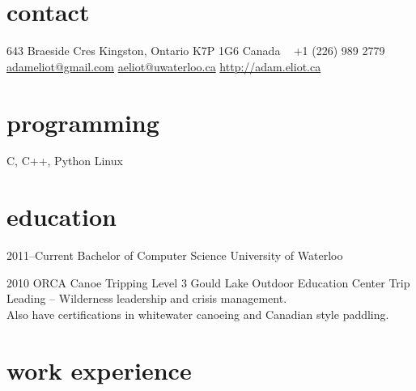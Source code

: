 \documentclass[]{eliot-cv} %
\begin{document}


\begin{aside} %
\section{contact}
643 Braeside Cres
Kingston, Ontario 
K7P 1G6
Canada
~
+1 (226) 989 2779
~
\href{mailto:adameliot@gmail.com}{adameliot@gmail.com}
\href{mailto:aeliot@uwaterloo.ca}{aeliot@uwaterloo.ca}
\href{http://adam.eliot.ca}{http://adam.eliot.ca}
\section{programming}
C, C++, Python
Linux
\end{aside}


\section{education}

\begin{entrylist}
\entry
{2011--Current}
{Bachelor {\normalfont of Computer Science}}
{University of Waterloo}
{}

\entry
{2010}
{ORCA {\normalfont Canoe Tripping Level 3}}
{Gould Lake Outdoor Education Center}
{Trip Leading -- Wilderness leadership and crisis management. \\
Also have certifications in whitewater canoeing and Canadian style paddling.}

\end{entrylist}


\section{work experience}
\end{document}
